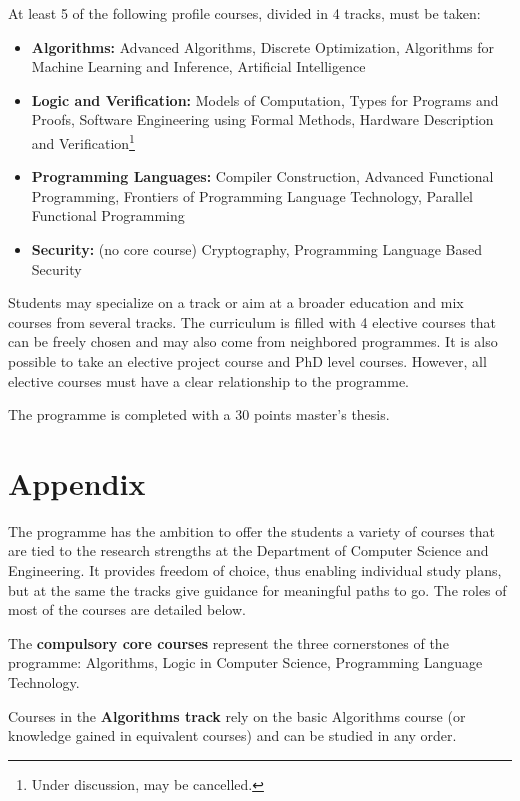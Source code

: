 \documentclass[11pt]{article}
\begin{document}
At least 5 of the following profile courses, divided in 4 tracks, must be 
taken:

\begin{itemize}
\item {\bf Algorithms:} Advanced Algorithms, Discrete Optimization, Algorithms
for Machine Learning and Inference, Artificial Intelligence
\item {\bf Logic and Verification:} Models of Computation, 
Types for Programs and Proofs, Software Engineering using Formal Methods, 
Hardware Description and Verification\footnote{Under discussion, may be 
cancelled.}
\item {\bf Programming Languages:} Compiler Construction, Advanced Functional 
Programming, Frontiers of Programming Language Technology, Parallel
Functional Programming
\item {\bf Security:} (no core course) Cryptography, Programming Language 
Based Security
\end{itemize}

Students may specialize on a track or aim at a broader education and mix 
courses from several tracks. The curriculum is filled with 4 elective courses
that can be freely chosen and may also come from neighbored programmes. It is 
also possible to take an elective project course and PhD level courses.
However, all elective courses must have a clear relationship to the programme.

The programme is completed with a 30 points master's thesis.

\newpage
\section*{Appendix}

The programme has the ambition to offer the students a variety of courses that
are tied to the research strengths at the Department of Computer Science and
Engineering. It provides freedom of choice, thus enabling individual study 
plans, but at the same the tracks give guidance for meaningful paths to go.
The roles of most of the courses are detailed below.

\bigskip
The {\bf compulsory core courses} represent the three cornerstones of the 
programme: Algorithms, Logic in Computer Science, Programming Language 
Technology.

\bigskip
Courses in the {\bf Algorithms track} rely on the basic Algorithms course (or
knowledge gained in equivalent courses) and can be studied in any order.
\end{document}
